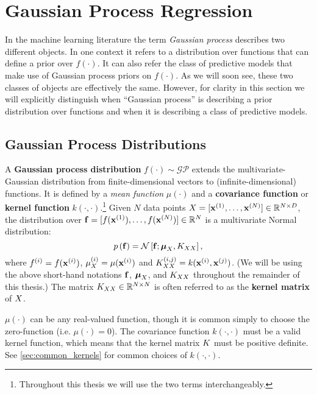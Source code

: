 \section{Gaussian Process Regression}
\label{sec:gps}

In the machine learning literature the term \emph{Gaussian process} describes two different objects.
In one context it refers to a distribution over functions that can define a prior over $f(\cdot)$.
It can also refer the class of predictive models that make use of Gaussian process priors on $f(\cdot)$.
As we will soon see, these two classes of objects are effectively the same.
However, for clarity in this section we will explicitly distinguish when ``Gaussian process'' is describing a prior distribution over functions and when it is describing a class of predictive models.

\subsection{Gaussian Process Distributions}
\label{sec:gp_dist}
A {\bf Gaussian process distribution} $f(\cdot) \sim \mathcal{GP}$ extends the multivariate-Gaussian distribution from finite-dimensional vectors to (infinite-dimensional) functions.
It is defined by a \emph{mean function} $\mu(\cdot)$ and a {\bf covariance function} or {\bf kernel function} $k(\cdot, \cdot)$.\footnote{
  Throughout this thesis we will use the two terms interchangeably.
}
Given $N$ data points $X = [ \mathbf{x}^{(1)}, \ldots, \mathbf{x}^{(N)} ] \in \mathbb{R}^{N \times D}$,
the distribution over $\mathbf{f} = [ f(\mathbf{x}^{(1)}), \ldots, f(\mathbf{x}^{(N)}) ] \in \mathbb{R}^{N}$ is a multivariate Normal distribution:
\begin{equation}
 p \left( \bfn \right) = \normaldist{ \bfn ; \bmu_\bX}{ \bK_{\bX\bX} },
 \label{eqn:prior_finite}
\end{equation}
where $f^{(i)} = f(\mathbf{x}^{(i)})$, $\mu^{(i)}_{X} = \mu( \mathbf{x}^{(i)} )$ and $K_{XX}^{(i,j)} = k(\mathbf{x}^{(i)}, \mathbf{x}^{(j)})$.
(We will be using the above short-hand notations $\mathbf{f}$, $\boldsymbol{\mu}_{X}$, and $K_{XX}$ throughout the remainder of this thesis.)
The matrix $K_{XX} \in \mathbb{R}^{N \times N}$ is often referred to as the {\bf kernel matrix} of $X$.

$\mu(\cdot)$ can be any real-valued function, though it is common simply to choose the zero-function (i.e. $\mu(\cdot) = 0$).
The covariance function $k(\cdot, \cdot)$ must be a valid kernel function, which means that the kernel matrix $K$ must be positive definite.
See \cref{sec:common_kernels} for common choices of $k(\cdot, \cdot)$.

